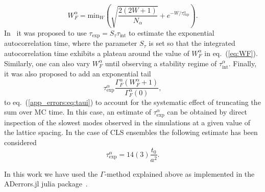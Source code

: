 \begin{equation}
\label{eq:WF}
W_F^{\alpha}=\textrm{min}_W\left(\sqrt{\frac{2(2W+1)}{N_{\alpha}}}+e^{-W/\tau_{\textrm{exp}}^{\alpha}}\right).
\end{equation}
In~\citep{Wolff:2003sm} it was proposed to use $\tau_{\textrm{exp}}=S_{\tau}\tau_{\textrm{int}}$ to estimate the exponential autocorrelation time, where the parameter $S_{\tau}$ 
is set so that the integrated autocorrelation time exhibits a plateau around the value of $W_F^\alpha$ in eq.~(\ref{eq:WF}). Similarly, one can also vary $W_F^{\alpha}$ until observing a stability regime of $\tau_{\textrm{int}}^{\alpha}$. Finally, it was also proposed to add an exponential tail~\citep{Schaefer:2010hu}
\begin{equation}
\tau_{\textrm{exp}}^{\alpha}\frac{\Gamma_F^{\alpha}(W_F^{\alpha}+1)}{\Gamma_F^{\alpha}(0)},
\end{equation}
to eq.~(\ref{app_errors:eq:taui}) to account for the systematic effect of truncating the sum over MC time. In this case, an estimate of $\tau_{\textrm{exp}}^{\alpha}$ can be obtained by direct inspection of the slowest modes observed in the simulations at a given value of the lattice spacing. In the case of CLS ensembles the following estimate has been considered~\citep{Bruno:2014jqa}
\begin{equation}
\tau_{\textrm{exp}}^{\alpha}=14(3)\frac{t_0}{a^2}.
\end{equation}

In this work we have used the $\Gamma$-method explained above as implemented in the ADerrors.jl julia package~\citep{Ramos:2020scv}.



